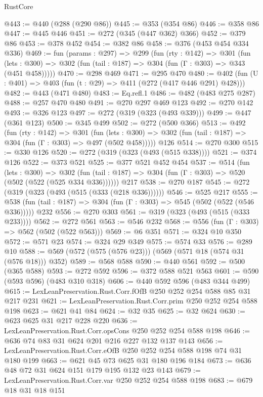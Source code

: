 \begin{lexlean}{RustCore}
\begin{coremodule}
@443 := @440 (@288 (@290 @86))
@445 := @353 (@354 @86)
@446 := @358 @86
@447 := @445 @446
@451 := @272 (@345 (@447 @362) @366)
@452 := @379 @86
@453 := @378 @452
@454 := @382 @86
@458 := @376 (@453 @454 @334 @336)
@469 := fun (params : @297) =>
  @299
    (fun (rty : @142) =>
    @301
      (fun (lets : @300) => @302 (fun (tail : @187) => @304 (fun (Γ : @303) => @343 (@451 @458)))))
@470 := @298 @469
@471 := @295 @470
@480 := @402 (fun (U : @401) => @403 (fun (t : @29) => @411 (@272 (@417 @446 @291) @428)))
@482 := @443 (@471 @480)
@483 := Eq.refl.{1}
@486 := @482 (@483 @275 @287)
@488 := @257 @470 @480
@491 := @270 @297 @469 @123
@492 := @270 @142
@493 := @326 @123
@497 := @272 (@319 (@323 (@493 @339)))
@499 := @447 (@361 @123)
@500 := @345 @499
@502 := @272 (@500 @366)
@513 := @492
    (fun (rty : @142) =>
    @301
      (fun (lets : @300) => @302 (fun (tail : @187) => @304 (fun (Γ : @303) => @497 (@502 @458)))))
    @126
@514 := @270 @300
@515 := @330 @126
@520 := @272 (@319 (@323 (@493 (@515 @338))))
@521 := @374 @126
@522 := @373 @521
@525 := @377 @521 @452 @454
@537 := @514
    (fun (lets : @300) =>
    @302 (fun (tail : @187) => @304 (fun (Γ : @303) => @520 (@502 (@522 (@525 @334 @336))))))
    @217
@538 := @270 @187
@545 := @272 (@319 (@323 (@493 (@515 (@333 (@218 @336))))))
@546 := @525 @217
@555 := @538 (fun (tail : @187) => @304 (fun (Γ : @303) => @545 (@502 (@522 (@546 @336))))) @232
@556 := @270 @303
@561 := @319 (@323 (@493 (@515 (@333 @233))))
@562 := @272 @561
@563 := @546 @232
@568 := @556 (fun (Γ : @303) => @562 (@502 (@522 @563)))
@569 := @6 @351
@571 := @324 @10 @350
@572 := @571 @23
@574 := @324 @29 @349
@575 := @574 @33
@576 := @289 @10
@588 := @569 (@572 (@575 (@576 @23))) (@569 (@571 @18 (@574 @31 (@576 @18))) @352)
@589 := @568 @588
@590 := @440 @561
@592 := @500 (@365 @588)
@593 := @272 @592
@596 := @372 @588 @521 @563
@601 := @590 (@593 @596) (@483 @310 @318)
@606 := @440 @592 @596 (@483 @344 @499)
@615 := LexLeanPreservation.Rust.Corr.fOfB @250 @252 @254 @588 @85 @31 @217 @231
@621 := LexLeanPreservation.Rust.Corr.prim @250 @252 @254 @588 @198
@623 := @621 @41 @84
@624 := @32 @35
@625 := @32 @624
@630 := @623 @625 @31 @217 @228 @220
@636 := LexLeanPreservation.Rust.Corr.opsCons @250 @252 @254 @588 @198
@646 := @636 @74 @83 @31 @624 @201 @216 @227 @132 @137 @143
@656 := LexLeanPreservation.Rust.Corr.eOfB @250 @252 @254 @588 @198 @74 @31 @180 @199
@663 := @621 @45 @73 @625 @31 @180 @196 @184
@673 := @636 @48 @72 @31 @624 @151 @179 @195 @132 @23 @143
@679 := LexLeanPreservation.Rust.Corr.var @250 @252 @254 @588 @198
@683 := @679 @18 @31 @18 @151

\end{coremodule}
\end{lexlean}
